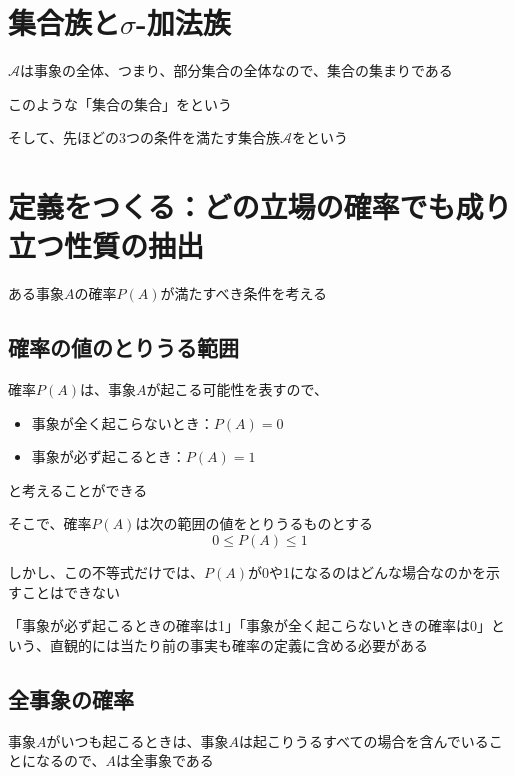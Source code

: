 \documentclass[../../../topic_probability-statistics]{subfiles}
\begin{document}
\sectionline
\section{集合族と$\sigma$-加法族}

$\mathscr{A}$は事象の全体、つまり、部分集合の全体なので、集合の集まりである

このような「集合の集合」をという

\br

そして、先ほどの3つの条件を満たす集合族$\mathscr{A}$をという

\sectionline
\section{定義をつくる：どの立場の確率でも成り立つ性質の抽出}

ある事象$A$の確率$P(A)$が満たすべき条件を考える

\subsection{確率の値のとりうる範囲}

確率$P(A)$は、事象$A$が起こる可能性を表すので、
\begin{itemize}
  \item 事象が全く起こらないとき：$P(A) =0$
  \item 事象が必ず起こるとき：$P(A) = 1$
\end{itemize}
と考えることができる

\br

そこで、確率$P(A)$は次の範囲の値をとりうるものとする
\begin{equation*}
  0 \leq P(A) \leq 1
\end{equation*}

しかし、この不等式だけでは、$P(A)$が0や1になるのはどんな場合なのかを示すことはできない

\br

「事象が必ず起こるときの確率は1」「事象が全く起こらないときの確率は0」という、直観的には当たり前の事実も確率の定義に含める必要がある

\subsection{全事象の確率}

事象$A$がいつも起こるときは、事象$A$は起こりうるすべての場合を含んでいることになるので、$A$は全事象である
\end{document}
